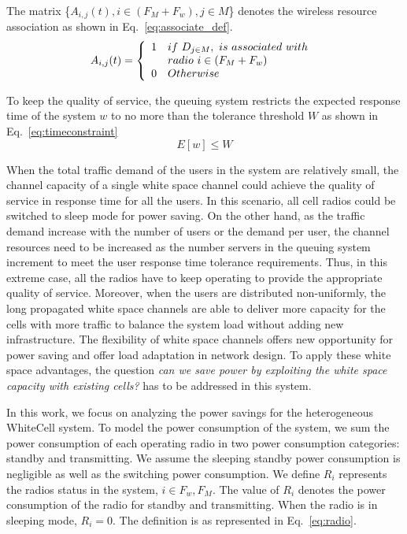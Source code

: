 The matrix \{$A_{i,j}(t),i\in (F_M+F_w), j\in M$\} denotes the wireless resource association
as shown in Eq.~\ref{eq:associate_def}.
\begin{equation}
\label{eq:associate_def}
 A_{i,j}(t) = \left\{ 
	  \begin{array}{l l}
	    1   &  if\ D_{j\in M},\ is\ associated\ with\ \\
		& radio\ i \in (F_M+F_w) \\
		0 &  Otherwise
			    \end{array} \right.
\end{equation}

To keep the quality of service, the queuing system restricts the expected response time of 
the system $w$ to no more than the tolerance threshold $W$ as shown in Eq.~\ref{eq:timeconstraint}
\begin{equation}
\label{eq:timeconstraint}
E[w]\le W
\end{equation}

When the total traffic demand of the users in the system are relatively small, 
the channel capacity of a single white space channel could achieve the quality of 
service in response time for all the users. 
In this scenario, all cell radios could be switched to sleep mode for power saving. 
On the other hand, as the traffic demand increase with the number of users or the demand per 
user, the channel resources need to be increased as the number servers in the queuing system increment 
to meet the user response time tolerance requirements. Thus, in this extreme case, all the radios 
have to keep operating to provide the appropriate quality of service. 
Moreover, when the users are distributed non-uniformly, the long propagated white space channels 
are able to deliver more capacity for the cells with more traffic to balance the system load 
without adding new infrastructure. 
The flexibility of white space channels offers new opportunity for power saving and 
offer load adaptation in network design.
To apply these white space advantages, the question {\it can we save power by exploiting 
the white space capacity with existing cells?} has to be addressed in this system.

In this work, we focus on analyzing the power savings for the heterogeneous 
WhiteCell system. 
To model the power consumption of the system, we sum the power consumption of each operating 
radio in two power consumption categories: standby and transmitting.
We assume the sleeping standby power consumption is negligible as well as the switching power consumption. 
We define $R_i$ represents the radios status in the system, $i\in {F_w,F_M}$. 
The value of $R_i$ denotes the power consumption of the radio for standby and transmitting.
When the radio is in sleeping mode, $R_i = 0$. 
The definition is as represented in Eq.~\ref{eq:radio}.

